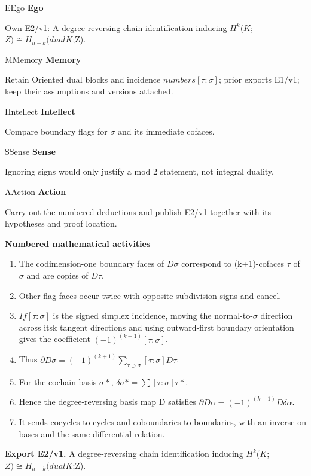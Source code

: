 \documentclass[preprint,12pt,aps,pra,showkeys,amsmath,amssymb,superscriptaddress,floatfix]{revtex4-2}
\theoremstyle{definition}
\theoremstyle{remark}
\newcommand{\mmfaculty}[3]{%
 \begin{mmfacultybox}{#1}{#2}
 {\sffamily\bfseries\color{MMBlue}#2}\par\smallskip #3
 \end{mmfacultybox}}
\newcommand{\field}[2]{\par\smallskip\noindent\textbf{#1.} #2\par}
\begin{document}
\mmfaculty{E}{Ego}{Own E2/v1: A degree-reversing chain identification inducing
\(H^k(K\);\(Z)\cong H_{n-k}(dualK\);Z).}

\mmfaculty{M}{Memory}{Retain Oriented dual blocks and incidence \(numbers[\tau :\sigma ]\);
prior exports E1/v1; keep their assumptions and versions attached.}

\mmfaculty{I}{Intellect}{Compare boundary flags for \(\sigma\) and its immediate cofaces.}

\mmfaculty{S}{Sense}{Ignoring signs would only justify a mod 2 statement, not integral
duality.}

\mmfaculty{A}{Action}{Carry out the numbered deductions and publish E2/v1 together with its
hypotheses and proof location.}

\smallskip\noindent\textbf{Numbered mathematical activities}

\begin{enumerate}[label=N2.\arabic*,leftmargin=3.4em]

\item The codimension-one boundary faces of \(D\sigma\) correspond to
(k+1)-cofaces \(\tau\) of \(\sigma\) and are copies of \(D\tau\).

\item Other flag faces occur twice with opposite subdivision signs and cancel.

\item \(If[\tau :\sigma ]\) is the signed simplex incidence, moving the
normal-to-\(\sigma\) direction across itsk tangent directions and using
outward-first boundary orientation gives the coefficient
\((-1)^{(k+1)}[\tau :\sigma ]\).

\item Thus
\(\partial D\sigma =(-1)^{(k+1)}\sum _{\tau \supset \sigma }[\tau :\sigma ]D\tau\).

\item For the cochain basis \(\sigma *\),
\(\delta \sigma *=\sum [\tau :\sigma ]\tau *\).

\item Hence the degree-reversing basis map D satisfies
\(\partial D\alpha =(-1)^{(k+1)}D\delta \alpha\).

\item It sends cocycles to cycles and coboundaries to boundaries, with an
inverse on bases and the same differential relation.

\end{enumerate}

\field{Export E2/v1}{A degree-reversing chain identification inducing
\(H^k(K\);\(Z)\cong H_{n-k}(dualK\);Z).}
\end{document}
